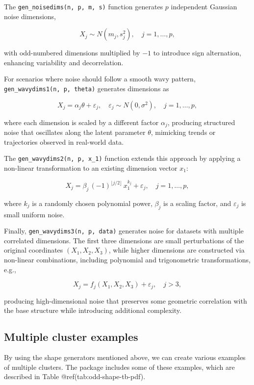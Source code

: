 \documentclass[
  11pt,
  a4paper,
]{report}
\begin{document}
The \texttt{gen\_noisedims(n,\ p,\ m,\ s)} function generates \(p\)
independent Gaussian noise dimensions,

\[
X_j \sim N(m_j, s_j^2), \quad j = 1, \dots, p,
\]

with odd-numbered dimensions multiplied by \(-1\) to introduce sign
alternation, enhancing variability and decorrelation.

For scenarios where noise should follow a smooth wavy pattern,
\texttt{gen\_wavydims1(n,\ p,\ theta)} generates dimensions as

\[
X_j = \alpha_j \theta + \varepsilon_j, \quad \varepsilon_j \sim N(0, \sigma^2), \quad j = 1, \dots, p,
\]

where each dimension is scaled by a different factor \(\alpha_j\),
producing structured noise that oscillates along the latent parameter
\(\theta\), mimicking trends or trajectories observed in real-world
data.

The \texttt{gen\_wavydims2(n,\ p,\ x\_1)} function extends this approach
by applying a non-linear transformation to an existing dimension vector
\(x_1\):

\[
X_j = \beta_j \, (-1)^{\lfloor j/2 \rfloor} \, x_1^{k_j} + \varepsilon_j, \quad j = 1, \dots, p,
\]

where \(k_j\) is a randomly chosen polynomial power, \(\beta_j\) is a
scaling factor, and \(\varepsilon_j\) is small uniform noise.

Finally, \texttt{gen\_wavydims3(n,\ p,\ data)} generates noise for
datasets with multiple correlated dimensions. The first three dimensions
are small perturbations of the original coordinates \((X_1, X_2, X_3)\),
while higher dimensions are constructed via non-linear combinations,
including polynomial and trigonometric transformations, e.g.,

\[
X_j = f_j(X_1, X_2, X_3) + \varepsilon_j, \quad j > 3,
\]

producing high-dimensional noise that preserves some geometric
correlation with the base structure while introducing additional
complexity.

\subsection{Multiple cluster examples}\label{multiple-cluster-examples}

By using the shape generators mentioned above, we can create various
examples of multiple clusters. The package includes some of these
examples, which are described in Table @ref(tab:odd-shape-tb-pdf).
\end{document}
